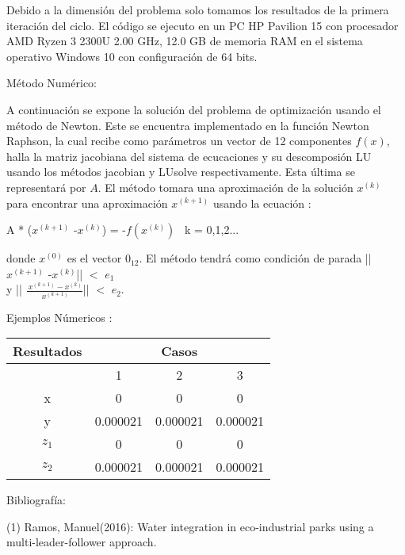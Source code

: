\documentclass{article}
\begin{document}
   Debido a la dimensi\'on del problema solo tomamos los resultados de la primera iteraci\'on del ciclo. El c\'odigo se ejecuto en un PC HP Pavilion 15 con procesador AMD Ryzen 3 2300U 2.00 GHz, 12.0 GB de memoria RAM  en el sistema operativo Windows 10 con configuraci\'on de 64 bits.
\newpage


\vspace{1.0cm}
\begin{center}
{\Large Método Numérico:}
\end{center}

\vspace{0.5 cm}
A continuaci\'on se expone la soluci\'on del problema de optimizaci\'on  usando el m\'etodo de Newton. Este se encuentra implementado en la funci\'on Newton Raphson, la cual recibe como par\'ametros un vector de 12 componentes $f(x)$, halla la matriz jacobiana del sistema de ecucaciones y su descomposi\'on LU usando los m\'etodos jacobian y LUsolve respectivamente. Esta \'ultima se representar\'a por $A$.  El m\'etodo tomara una aproximaci\'on de la soluci\'on $x^{(k)}$ para encontrar una aproximaci\'on $x^{(k+1)}$  usando la ecuaci\'on :  
\begin{center}

A * ($x^{(k+1)}$ -$x^{(k)}$) = -$f(x^{(k)})$ \ k = 0,1,2...
\end{center}

donde $x^{(0)}$ es el vector $0_{12}$. El m\'etodo tendr\'a como condici\'on de parada ||$x^{(k+1)}$ -$x^{(k)}$|| $<$ $e_{1}$ \\ y || $\frac{\  x^{(k+1)} - x^{(k)}}{\ x^{(k+1)}}$|| $<$ $e_{2}$.


\begin{center}
{\Large Ejemplos N\'umericos :}
\end{center}
\begin{center}
\begin{tabular}{|c|c|c|c|}
\hline

\multicolumn{1}{|c|}{Resultados} & \multicolumn{3}{|c|}{Casos}\\
\hline
 & 1 & 2 & 3\\
\hline
  x & 0&  0 & 0 \\ 
\hline
  y & 0.000021 & 0.000021 & 0.000021  \\
\hline
  $z_{1}$ & 0 & 0 & 0 \\
\hline
  $z_{2}$  & 0.000021 &  0.000021& 0.000021  \\
\hline


\end{tabular}

\end{center}


\begin{center}
\vspace{1cm}
{\Large Bibliograf\'ia:}
\end{center}


(1) Ramos, Manuel(2016): Water integration in eco-industrial parks using a multi-leader-follower approach.
\end{document}
